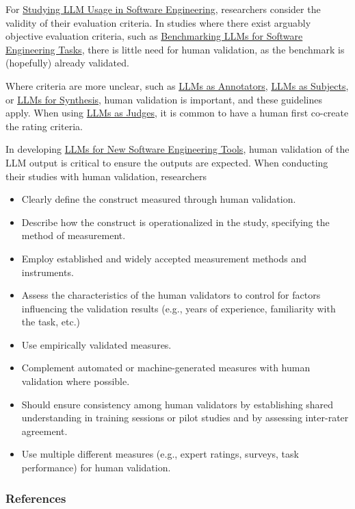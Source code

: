 For \href{/study-types/#studying-llm-usage-in-software-engineering}{Studying LLM Usage in Software Engineering}, researchers \should consider the validity of their evaluation criteria.
In studies where there exist arguably objective evaluation criteria, such as \href{/study-types/#benchmarking-llms-for-software-engineering-tasks}{Benchmarking LLMs for Software Engineering Tasks}, there is little need for human validation, as the benchmark is (hopefully) already validated.

Where criteria are more unclear, such as \href{/study-types/#llms-as-annotators}{LLMs as Annotators}, \href{/study-types/#llms-as-subjects}{LLMs as Subjects}, or \href{/study-types/#llms-for-synthesis}{LLMs for Synthesis}, human validation is important, and these guidelines apply. When using \href{/study-types/#llms-as-judges}{LLMs as Judges}, it is common to have a human first co-create the rating criteria. 

In developing \href{/study-types/#llms-for-new-software-engineering-tools}{LLMs for New Software Engineering Tools}, human validation of the LLM output is critical to ensure the outputs are expected.
When conducting their studies with human validation, researchers

\must
\begin{itemize}
    \item Clearly define the construct measured through human validation.
    \item Describe how the construct is operationalized in the study, specifying the method of measurement.
    \item Employ established and widely accepted measurement methods and instruments.
\end{itemize}

\should
\begin{itemize}
    \item Assess the characteristics of the human validators to control for factors influencing the validation results (e.g., years of experience, familiarity with the task, etc.)
    \item Use empirically validated measures.
    \item Complement automated or machine-generated measures with human validation where possible.
    \item Should ensure consistency among human validators by establishing shared understanding in training sessions or pilot studies and by assessing inter-rater agreement.
\end{itemize}

\may
\begin{itemize}
    \item Use multiple different measures (e.g., expert ratings, surveys, task performance) for human validation.
\end{itemize}

\subsubsection{References}





